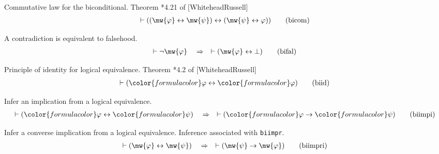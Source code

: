 \begin{lemma} {Commutative law for the biconditional.}
Theorem *4.21 of [WhiteheadRussell] 
\begin{align}
\vdash ( ( \mw{\varphi} \leftrightarrow \mw{\psi} ) \leftrightarrow ( \mw{\psi}
    \leftrightarrow {\varphi} ) )\label{eq:bicom}\tag{bicom}
\end{align}
\end{lemma}


\begin{lemma} {A contradiction is equivalent to falsehood.} 
\begin{align}
\vdash \lnot \mw{\varphi} \quad\Rightarrow\quad \vdash ( \mw{\varphi} \leftrightarrow \bot
    )\label{eq:bifal}\tag{bifal}
\end{align}
\end{lemma}


\begin{lemma} {Principle of identity for logical equivalence.} 
Theorem *4.2 of
     [WhiteheadRussell] %
\begin{align}
\vdash ( {\color{formulacolor}\varphi} \leftrightarrow
    {\color{formulacolor}\varphi} )\label{eq:biid}\tag{biid}
\end{align}
\end{lemma}


\begin{lemma} {Infer an implication from a logical
equivalence.}  
\begin{align}
\vdash ( {\color{formulacolor}\varphi} \leftrightarrow
    {\color{formulacolor}\psi} )\quad\Rightarrow\quad \vdash (
    {\color{formulacolor}\varphi} \rightarrow {\color{formulacolor}\psi}
    )\label{eq:biimpi}\tag{biimpi}
\end{align}
\end{lemma}


\begin{lemma} {Infer a converse implication from a logical
equivalence.}  Inference
       associated with {\tt biimpr}.  %
\begin{align}
\vdash ( \mw{\varphi} \leftrightarrow \mw{\psi} )\quad\Rightarrow\quad \vdash (
    \mw{\psi} \rightarrow \mw{\varphi} )\label{eq:biimpri}\tag{biimpri}
\end{align}
\end{lemma}


